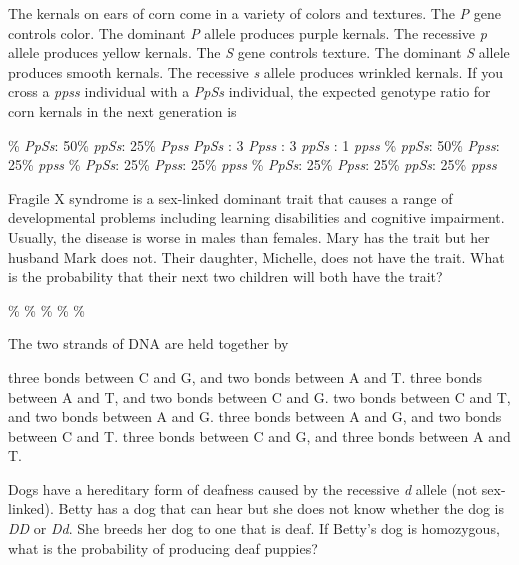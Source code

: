 \newpage

\question
The kernals on ears of corn come in a variety of colors and textures. The \textit{P} gene controls color.  The dominant \textit{P} allele produces purple kernals. The recessive \textit{p} allele produces yellow kernals.  The \textit{S} gene controls texture. The dominant \textit{S} allele produces smooth kernals. The recessive \textit{s} allele produces wrinkled kernals. If you cross a \textit{ppss} individual with a \textit{PpSs} individual, the expected genotype ratio for corn kernals in the next generation is 

\begin{choices}
\% \textit{PpSs}: 50\% \textit{ppSs}: 25\% \textit{Ppss}
 \textit{PpSs} : 3 \textit{Ppss} : 3 \textit{ppSs} : 1 \textit{ppss}
\% \textit{ppSs}: 50\% \textit{Ppss}: 25\% \textit{ppss}
\% \textit{PpSs}: 25\% \textit{Ppss}: 25\% \textit{ppss}
\% \textit{PpSs}: 25\% \textit{Ppss}: 25\% \textit{ppSs}: 25\% \textit{ppss}
\end{choices}

\question
Fragile X syndrome is a sex-linked dominant trait that causes a range of developmental problems including learning disabilities and cognitive impairment.  Usually, the disease is worse in males than females.  Mary has the trait but her husband Mark does not. Their daughter, Michelle, does not have the trait. What is the probability that their next two children will both have the trait?

\begin{choices}
\%
\%
\%
\%
\%
\end{choices}

\question
The two strands of DNA are held together by

\begin{choices}
\correctchoice three bonds between C and G, and two bonds between A and T.
\choice three bonds between A and T, and two bonds between C and G.
\choice two bonds between C and T, and two bonds between A and G.
\choice three bonds between A and G, and two bonds between C and T.
\choice three bonds between C and G, and three bonds between A and T.
\end{choices}

\question
Dogs have a hereditary form of deafness caused by the recessive \textit{d} allele (not sex-linked).  Betty has a dog that can hear but she does not know whether the dog is \textit{DD} or \textit{Dd}.  She breeds her dog to one that is deaf.  If Betty's dog is homozygous, what is the probability of producing deaf puppies?

